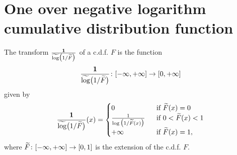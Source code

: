 \section{One over negative logarithm cumulative distribution function}

\begin{definition}
  \label{def:one-div-neg-log-cdf}
  \leanok
  The transform $\frac{\mathbf{1}}{\widetilde{\log} \big( 1 / \widetilde{F} \big)}$ of a c.d.f. $F$ is the function
  \begin{align*}
    \frac{\mathbf{1}}{\widetilde{\log} \big( 1 / \widetilde{F} \big)} \colon [-\infty,+\infty] \to [0,+\infty]
  \end{align*}
  given by
  \begin{align*}
    \frac{\mathbf{1}}{\widetilde{\log} \big( 1 / \widetilde{F} \big)}(x) = \begin{cases}
      0 & \; \text{ if } \widetilde{F}(x) = 0 \\
      \frac{1}{\log \big( 1/\widetilde{F}(x) \big)} & \; \text{ if } 0 < \widetilde{F}(x) < 1 \\
      +\infty & \; \text{ if } \widetilde{F}(x) = 1 ,
      \end{cases}
  \end{align*}
  where $\widetilde{F} \colon [-\infty,+\infty] \to [0,1]$ is the extension of the c.d.f. $F$.
\end{definition}
